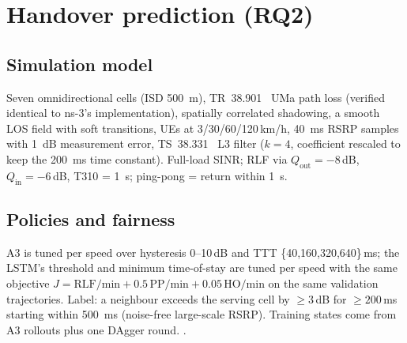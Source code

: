 \section{Handover prediction (RQ2)}
\subsection{Simulation model}
Seven omnidirectional cells (ISD \SI{500}{m}), TR~38.901~\cite{tr38901} UMa path loss (verified identical to ns-3's
implementation), spatially correlated shadowing, a smooth LOS field with soft transitions, UEs at
3/30/60/120\,km/h, \SI{40}{ms} RSRP samples with \SI{1}{dB} measurement error, TS~38.331~\cite{ts38331} L3 filter
($k=4$, coefficient rescaled to keep the \SI{200}{ms} time constant). Full-load SINR; RLF via
$Q_\text{out}=-8$\,dB, $Q_\text{in}=-6$\,dB, T310 = \SI{1}{s}; ping-pong = return within \SI{1}{s}.
\subsection{Policies and fairness}
A3 is tuned per speed over hysteresis 0--10\,dB and TTT \{40,160,320,640\}\,ms; the LSTM's threshold
and minimum time-of-stay are tuned per speed with the same objective
$J = \text{RLF/min} + 0.5\,\text{PP/min} + 0.05\,\text{HO/min}$ on the same validation trajectories.
Label: a neighbour exceeds the serving cell by $\geq 3$\,dB for $\geq 200$\,ms starting within
\SI{500}{ms} (noise-free large-scale RSRP). Training states come from A3 rollouts plus one DAgger round.
.
